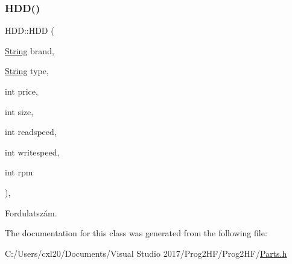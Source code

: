 \subsubsection{\texorpdfstring{HDD()}{HDD()}}
{\footnotesize\ttfamily H\+D\+D\+::\+H\+DD (\begin{DoxyParamCaption}\item[{\mbox{\hyperlink{class_string}{String}}}]{brand,  }\item[{\mbox{\hyperlink{class_string}{String}}}]{type,  }\item[{int}]{price,  }\item[{int}]{size,  }\item[{int}]{readspeed,  }\item[{int}]{writespeed,  }\item[{int}]{rpm }\end{DoxyParamCaption})\hspace{0.3cm}{\ttfamily [inline]}, {\ttfamily [explicit]}}



Fordulatszám. 



The documentation for this class was generated from the following file\+:\begin{DoxyCompactItemize}
\item 
C\+:/\+Users/cxl20/\+Documents/\+Visual Studio 2017/\+Prog2\+H\+F/\+Prog2\+H\+F/\mbox{\hyperlink{_parts_8h}{Parts.\+h}}\end{DoxyCompactItemize}
